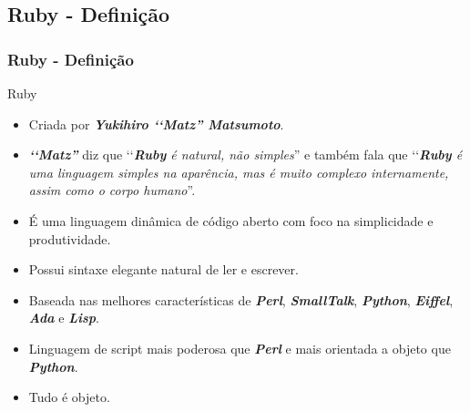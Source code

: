 \subsection{Ruby - Definição} 
\begin{frame}
 \frametitle{Ruby - Definição}
  
  \begin{block}{Ruby}
  
   \begin{itemize}
   
   \item Criada por \emph{\textbf{Yukihiro ‘‘Matz'' Matsumoto}}.
   
    \item \emph{\textbf{‘‘Matz''}} diz que ‘‘\emph{\textbf{Ruby} é natural, não simples}'' e também fala que 
    ‘‘\emph{\textbf{Ruby} é uma linguagem simples na aparência, mas é muito complexo internamente, assim como 
    o corpo humano}''.
   
    \item É uma linguagem dinâmica de código aberto com foco na simplicidade e produtividade.
    
    \item Possui sintaxe elegante natural de ler e escrever.
    
    \item Baseada nas melhores características de \emph{\textbf{Perl}}, \emph{\textbf{SmallTalk}}, 
    \emph{\textbf{Python}}, \emph{\textbf{Eiffel}}, \emph{\textbf{Ada}} e \emph{\textbf{Lisp}}.
    
    \item Linguagem de script mais poderosa que \emph{\textbf{Perl}} e mais orientada a objeto que 
    \emph{\textbf{Python}}.
    
    \item Tudo é objeto.   
    
   \end{itemize}   
   
  \end{block}
  
\end{frame}


